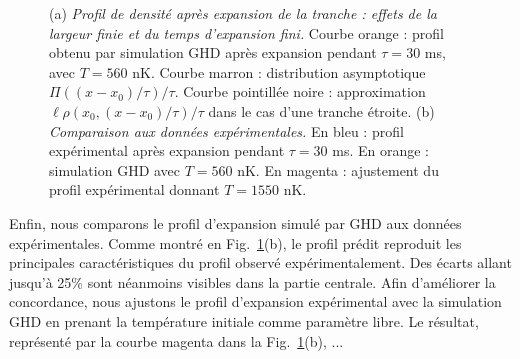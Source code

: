 \begin{figure}[!htb]
\centering
{}
\caption{(a) {\it Profil de densité après expansion de la tranche : effets de la largeur finie et du temps d’expansion fini.} Courbe orange : profil obtenu par simulation GHD après expansion pendant $\tau = 30$ ms, avec $T = 560$ nK. Courbe marron : distribution asymptotique $\Pi((x - x_0)/\tau)/\tau$. Courbe pointillée noire : approximation $\ell \rho(x_0, (x - x_0)/\tau)/\tau$ dans le cas d’une tranche étroite. (b) {\it Comparaison aux données expérimentales.} En bleu : profil expérimental après expansion pendant $\tau = 30$ ms. En orange : simulation GHD avec $T = 560$ nK. En magenta : ajustement du profil expérimental donnant $T = 1550$ nK.}
\label{fig:simul_expansion}
\end{figure}

Enfin, nous comparons le profil d’expansion simulé par GHD aux données expérimentales.  
Comme montré en Fig.~\ref{fig:simul_expansion}(b), le profil prédit reproduit les principales caractéristiques du profil observé expérimentalement.  
Des écarts allant jusqu’à 25\% sont néanmoins visibles dans la partie centrale.  
Afin d’améliorer la concordance, nous ajustons le profil d’expansion expérimental avec la simulation GHD en prenant la température initiale comme paramètre libre.  
Le résultat, représenté par la courbe magenta dans la Fig.~\ref{fig:simul_expansion}(b), ...

